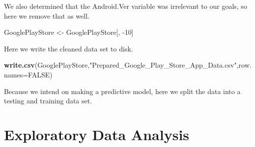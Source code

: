 \documentclass[]{article}
\newenvironment{Shaded}{\begin{snugshade}}{\end{snugshade}}
\newcommand{\DataTypeTok}[1]{\textcolor[rgb]{0.13,0.29,0.53}{#1}}
\newcommand{\DecValTok}[1]{\textcolor[rgb]{0.00,0.00,0.81}{#1}}
\newcommand{\FloatTok}[1]{\textcolor[rgb]{0.00,0.00,0.81}{#1}}
\newcommand{\KeywordTok}[1]{\textcolor[rgb]{0.13,0.29,0.53}{\textbf{#1}}}
\newcommand{\NormalTok}[1]{#1}
\newcommand{\OperatorTok}[1]{\textcolor[rgb]{0.81,0.36,0.00}{\textbf{#1}}}
\newcommand{\OtherTok}[1]{\textcolor[rgb]{0.56,0.35,0.01}{#1}}
\newcommand{\StringTok}[1]{\textcolor[rgb]{0.31,0.60,0.02}{#1}}
\begin{document}
We also determined that the Android.Ver variable was irrelevant to our
goals, so here we remove that as well.

\begin{Shaded}
\begin{Highlighting}[]
\NormalTok{GooglePlayStore <-}\StringTok{ }\NormalTok{GooglePlayStore[, }\DecValTok{-10}\NormalTok{]}
\end{Highlighting}
\end{Shaded}

Here we write the cleaned data set to disk.

\begin{Shaded}
\begin{Highlighting}[]
\KeywordTok{write.csv}\NormalTok{(GooglePlayStore,}\StringTok{"Prepared_Google_Play_Store_App_Data.csv"}\NormalTok{,}\DataTypeTok{row.names=}\OtherTok{FALSE}\NormalTok{)}
\end{Highlighting}
\end{Shaded}

Because we intend on making a predictive model, here we split the data
into a testing and training data set.

\begin{Shaded}
\end{Shaded}

\hypertarget{exploratory-data-analysis}{%
\section{Exploratory Data Analysis}\label{exploratory-data-analysis}}
\end{document}
